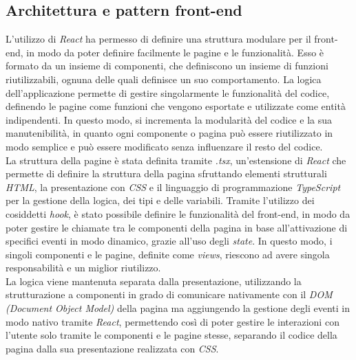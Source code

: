 \subsection{Architettura e pattern front-end}\label{subsec:architettura-pattern}

L'utilizzo di \textit{React} ha permesso di definire una struttura modulare per il front-end, in modo da poter definire facilmente le pagine e le funzionalità.
Esso è formato da un insieme di componenti, che definiscono un insieme di funzioni riutilizzabili, ognuna delle quali definisce un suo comportamento. 
La logica dell'applicazione permette di gestire singolarmente le funzionalità del codice, definendo le pagine come funzioni che vengono
esportate e utilizzate come entità indipendenti. In questo modo, si incrementa la modularità del codice e la sua manutenibilità, in quanto ogni componente
o pagina può essere riutilizzato in modo semplice e può essere modificato senza influenzare il resto del codice. \\

La struttura della pagine è stata definita tramite \textit{.tsx}, un'estensione di \textit{React} che permette di definire la struttura della pagina 
sfruttando elementi strutturali \textit{HTML}, la presentazione con \textit{CSS} e il linguaggio di programmazione \textit{TypeScript} per la gestione della logica, dei tipi e delle variabili.
Tramite l'utilizzo dei cosiddetti \textit{hook}, è stato possibile definire le funzionalità del front-end, in modo da poter gestire le chiamate tra le componenti della 
pagina in base all'attivazione di specifici eventi in modo dinamico, grazie all'uso degli \textit{state}.
In questo modo, i singoli componenti e le pagine, definite come \textit{views}, riescono ad avere singola responsabilità e un miglior riutilizzo. \\

La logica viene mantenuta separata dalla presentazione, utilizzando la strutturazione a componenti in grado di comunicare nativamente con il 
\textit{DOM (Document Object Model)} della pagina ma aggiungendo la gestione degli eventi in modo nativo tramite \textit{React}, permettendo così di poter gestire le interazioni con l'utente
solo tramite le componenti e le pagine stesse, separando il codice della pagina dalla sua presentazione realizzata con \textit{CSS}. \\

